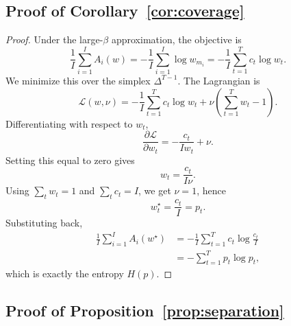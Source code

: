 \documentclass{article}
\newcommand{\simplex}{\Delta}
\begin{document}
\subsection{Proof of Corollary~\ref{cor:coverage}}

\begin{proof}
Under the large-\(\beta\) approximation, the objective is
\begin{equation}
    \frac{1}{I}\sum_{i=1}^{I} A_i(w)
    =
    -\frac{1}{I}\sum_{i=1}^{I}\log w_{m_i}
    =
    -\frac{1}{I}\sum_{t=1}^{T} c_t \log w_t.
\end{equation}
We minimize this over the simplex \(\simplex^{T-1}\). The Lagrangian is
\begin{equation}
    \mathcal{L}(w,\nu)
    =
    -\frac{1}{I}\sum_{t=1}^{T} c_t \log w_t
    +
    \nu\left(\sum_{t=1}^{T} w_t - 1\right).
\end{equation}
Differentiating with respect to \(w_t\),
\begin{equation}
    \frac{\partial \mathcal{L}}{\partial w_t}
    =
    -\frac{c_t}{I w_t} + \nu.
\end{equation}
Setting this equal to zero gives
\begin{equation}
    w_t = \frac{c_t}{I\nu}.
\end{equation}
Using \(\sum_t w_t = 1\) and \(\sum_t c_t = I\), we get \(\nu=1\), hence
\begin{equation}
    w_t^\star = \frac{c_t}{I} = p_t.
\end{equation}
Substituting back,
\begin{align}
    \frac{1}{I}\sum_{i=1}^{I} A_i(w^\star)
    &=
    -\frac{1}{I}\sum_{t=1}^{T} c_t \log \frac{c_t}{I} \\
    &=
    -\sum_{t=1}^{T} p_t \log p_t,
\end{align}
which is exactly the entropy \(H(p)\). \qedhere
\end{proof}

\subsection{Proof of Proposition~\ref{prop:separation}}
\end{document}
